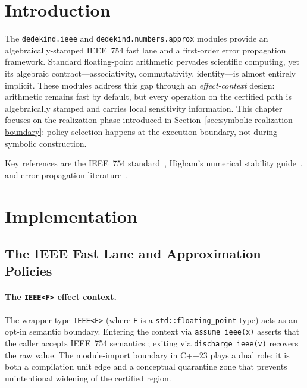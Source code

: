 \documentclass[11pt, a4paper]{report}
\begin{document}
\section{Introduction}
\label{sec:ieee-intro}

The \texttt{dedekind.ieee} and \texttt{dedekind.numbers.approx} modules provide an algebraically-stamped IEEE~754 fast lane and a first-order error propagation framework. Standard floating-point arithmetic pervades scientific computing, yet its algebraic contract---associativity, commutativity, identity---is almost entirely implicit. These modules address this gap through an \emph{effect-context} design: arithmetic remains fast by default, but every operation on the certified path is algebraically stamped and carries local sensitivity information.
This chapter focuses on the realization phase introduced in Section~\ref{sec:symbolic-realization-boundary}: policy selection happens at the execution boundary, not during symbolic construction.

Key references are the IEEE~754 standard~\cite{ieee754_2019}, Higham's numerical stability guide~\cite{higham2002accuracy}, and error propagation literature~\cite{ku1966notes, ogita2005accurate}.

\section{Implementation}
\label{sec:ieee-impl}

\subsection{The IEEE Fast Lane and Approximation Policies}

\paragraph{The \texttt{IEEE<F>} effect context.}
The wrapper type \texttt{IEEE<F>} (where \texttt{F} is a \texttt{std::floating\_point} type) acts as an opt-in semantic boundary.
Entering the context via \texttt{assume\_ieee(x)} asserts that the caller accepts IEEE~754 semantics \cite{ieee754_2019}; exiting via \texttt{discharge\_ieee(v)} recovers the raw value.
The module-import boundary in C++23 plays a dual role: it is both a compilation unit edge and a conceptual quarantine zone that prevents unintentional widening of the certified region.
\end{document}
